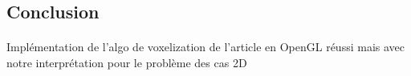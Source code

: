 \subsection{Conclusion}

\begin{frame}[fragile=singleslide]{\insertsectionhead}
  \framesubtitle{\insertsubsectionhead}
  {\Large Implémentation de l’algo de voxelization de l’article en OpenGL réussi mais avec notre interprétation pour le problème des cas 2D}
\end{frame}

